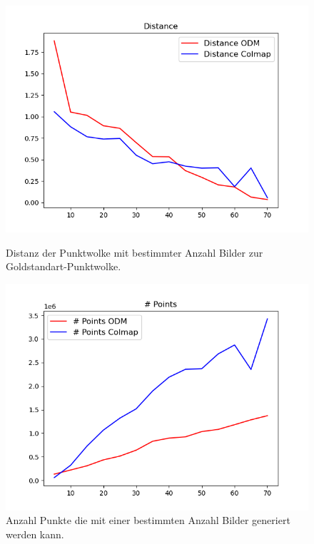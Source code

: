 \documentclass[12pt,titlepage, twoside]{article}
\begin{document}
\begin{figure}
    \centering
    \begin{minipage}{0.475\textwidth}
        \centering
        \includegraphics[width=1.0\textwidth]{./Images/DistanceCloudGen.png}
        \caption{Distanz der Punktwolke mit bestimmter Anzahl Bilder zur Goldstandart-Punktwolke.}
        \label{fig:DistanceCloudGen}
    \end{minipage}\hfill
    \begin{minipage}{0.475\textwidth}
        \centering
        \includegraphics[width=1.0\textwidth]{./Images/NPointsCloudGen.png}
        \caption{Anzahl Punkte die mit einer bestimmten Anzahl Bilder generiert werden kann.}
        \label{fig:NPointsCloudGen}
    \end{minipage}
\end{figure}
\end{document}
